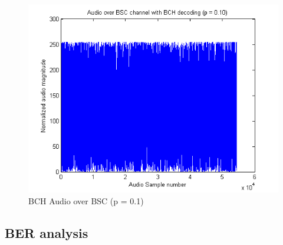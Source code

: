 \documentclass[a4paper]{article}
\begin{document}
\begin{figure}[H]
\centering
\includegraphics[scale=0.5]{plots/audio_over_bsc_bch_p_010.png}
\caption{BCH Audio over BSC (p = 0.1)}
\end{figure}

\subsection{BER analysis}
\end{document}
